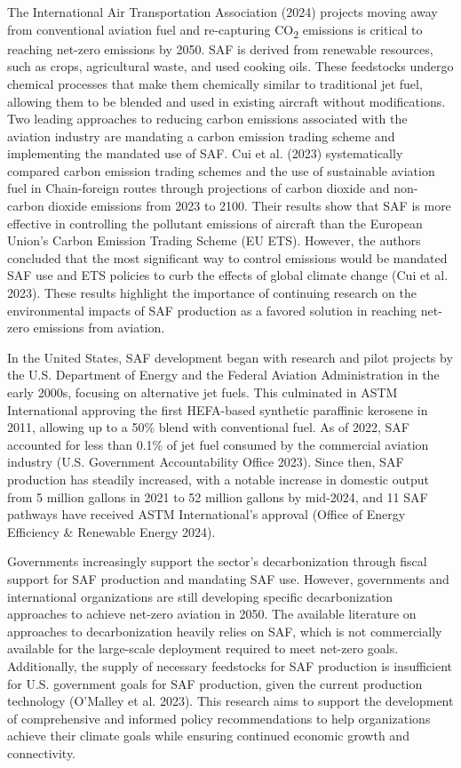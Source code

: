 \documentclass[12pt]{article}
\begin{document}
The International Air Transportation Association (2024) projects moving away from conventional aviation fuel and re-capturing CO\textsubscript{2} emissions is critical to reaching net-zero emissions by 2050. SAF is derived from renewable resources, such as crops, agricultural waste, and used cooking oils. These feedstocks undergo chemical processes that make them chemically similar to traditional jet fuel, allowing them to be blended and used in existing aircraft without modifications. 
Two leading approaches to reducing carbon emissions associated with the aviation industry are mandating a carbon emission trading scheme and implementing the mandated use of SAF. Cui et al. (2023) systematically compared carbon emission trading schemes and the use of sustainable aviation fuel in Chain-foreign routes through projections of carbon dioxide and non-carbon dioxide emissions from 2023 to 2100. Their results show that SAF is more effective in controlling the pollutant emissions of aircraft than the European Union’s Carbon Emission Trading Scheme (EU ETS). However, the authors concluded that the most significant way to control emissions would be mandated SAF use and ETS policies to curb the effects of global climate change (Cui et al. 2023). These results highlight the importance of continuing research on the environmental impacts of SAF production as a favored solution in reaching net-zero emissions from aviation. 

In the United States, SAF development began with research and pilot projects by the U.S. Department of Energy and the Federal Aviation Administration in the early 2000s, focusing on alternative jet fuels. This culminated in ASTM International approving the first HEFA-based synthetic paraffinic kerosene in 2011, allowing up to a 50\% blend with conventional fuel. As of 2022, SAF accounted for less than 0.1\% of jet fuel consumed by the commercial aviation industry (U.S. Government Accountability Office 2023). Since then, SAF production has steadily increased, with a notable increase in domestic output from 5 million gallons in 2021 to 52 million gallons by mid-2024, and 11 SAF pathways have received ASTM International’s approval (Office of Energy Efficiency \& Renewable Energy 2024). 

Governments increasingly support the sector's decarbonization through fiscal support for SAF production and mandating SAF use. However, governments and international organizations are still developing specific decarbonization approaches to achieve net-zero aviation in 2050. The available literature on approaches to decarbonization heavily relies on SAF, which is not commercially available for the large-scale deployment required to meet net-zero goals. Additionally, the supply of necessary feedstocks for SAF production is insufficient for U.S. government goals for SAF production, given the current production technology (O’Malley et al. 2023). This research aims to support the development of comprehensive and informed policy recommendations to help organizations achieve their climate goals while ensuring continued economic growth and connectivity.
\end{document}
